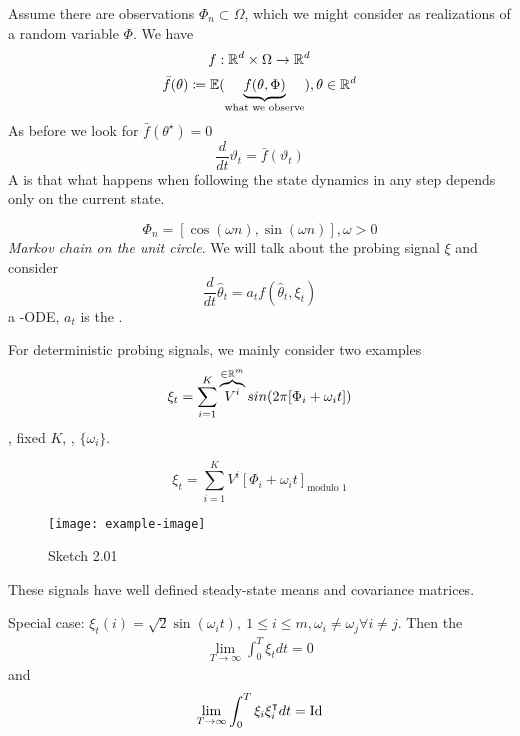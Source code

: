 Assume there are observations \(\Phi_n\subset \Omega\), which 
we might consider as realizations of a random variable \(\Phi\).
We have \[f:\mathbb{R}^d\times \Omega\to\mathbb{R}^d\]
\[\bar{f}(\theta)\coloneqq \mathbb{E}(\underbrace{f(\theta,\Phi)}_{\text{what we observe}}), \theta\in\mathbb{R}^d\]
As before we look for \(\bar{f}(\theta^\star)=0\)
\[\frac{d}{dt}\vartheta_t=\bar{f}(\vartheta_t)\]
A  is that what happens when following the state 
dynamics in any step depends only on the current state.

\[\Phi_n=[\cos(\omega n),\sin(\omega n)],\omega>0\]
\textit{Markov chain on the unit circle}. We will talk about the probing signal \(\xi\)
and consider 
\begin{equation}\label{eq:qsa-ode}
    \frac{d}{dt}\hat{\theta}_t=a_t  f(\hat{\theta}_t,\xi_t)
\end{equation}
a -ODE, \(a_t\) is the . 

For deterministic probing signals, we mainly consider two examples 
\[\xi_t=\sum_{i=1}^K \overbrace{V^i}^{\in \mathbb{R}^m}sin(2\pi[\Phi_i+\omega_i t])\]
, fixed \(K\), ,  \(\{\omega_i\}\).

\[\xi_t=\sum_{i=1}^K V^i[\Phi_i+\omega_it]_{\text{modulo 1}}\]

\begin{figure}[H]\label{fig:2.01}
    \centering
    \texttt{[image: example-image]}
    \caption{Sketch 2.01}
\end{figure}

These signals have well defined steady-state means and covariance matrices.

Special case: \(\xi_t(i)=\sqrt{2}\sin(\omega_it),\ 1\leq i\leq m,\omega_i\neq \omega_j\forall i\neq j\). Then the 
\begin{align*}
    \lim_{T\to\infty}\int_{0}^{T}\xi_t dt =0 
\end{align*}
and 
\begin{align*}
    \lim_{T\to\infty}\int_0^T\xi_i\xi_i^\intercal dt=\text{Id}
\end{align*}

